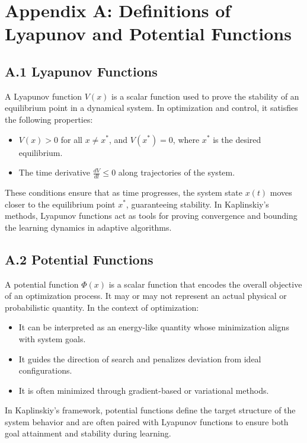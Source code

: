 \documentclass[12pt]{article}
\begin{document}
\section*{Appendix A: Definitions of Lyapunov and Potential Functions}

\subsection*{A.1 Lyapunov Functions}

A Lyapunov function \( V(x) \) is a scalar function used to prove the stability of an equilibrium point in a dynamical system. In optimization and control, it satisfies the following properties:
\begin{itemize}
  \item \( V(x) > 0 \) for all \( x \neq x^* \), and \( V(x^*) = 0 \), where \( x^* \) is the desired equilibrium.
  \item The time derivative \( \frac{dV}{dt} \leq 0 \) along trajectories of the system.
\end{itemize}
These conditions ensure that as time progresses, the system state \( x(t) \) moves closer to the equilibrium point \( x^* \), guaranteeing stability. In Kaplinskiy’s methods, Lyapunov functions act as tools for proving convergence and bounding the learning dynamics in adaptive algorithms.

\subsection*{A.2 Potential Functions}

A potential function \( \Phi(x) \) is a scalar function that encodes the overall objective of an optimization process. It may or may not represent an actual physical or probabilistic quantity. In the context of optimization:
\begin{itemize}
  \item It can be interpreted as an energy-like quantity whose minimization aligns with system goals.
  \item It guides the direction of search and penalizes deviation from ideal configurations.
  \item It is often minimized through gradient-based or variational methods.
\end{itemize}
In Kaplinskiy’s framework, potential functions define the target structure of the system behavior and are often paired with Lyapunov functions to ensure both goal attainment and stability during learning.
\end{document}

